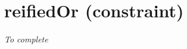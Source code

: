 \section{reifiedOr (constraint)}\label{reifiedor:reifiedorconstraint}\hypertarget{reifiedor:reifiedorconstraint}{}
\emph{To complete}
